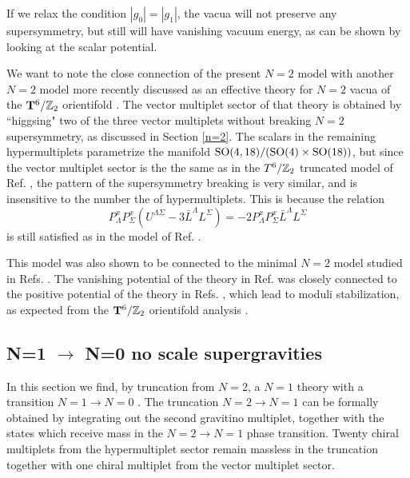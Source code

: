 \documentclass[a4paper,12pt]{article}
\begin{document}
If we relax the condition $|g_0|=|g_1|$, the vacua will not
preserve any supersymmetry, but still will have vanishing vacuum
energy, as can be shown by looking at the scalar potential.

We want to note the close connection of the present $N=2$ model
with another $N=2$ model more recently discussed as an effective
theory for $N=2$ vacua of the $\mathbf{T}^6/\mathbb{Z}_2$ orientifold
\cite{adflq}. The vector multiplet sector of that theory is
obtained by ``higgsing" two of the three vector multiplets without
breaking $N=2$ supersymmetry, as discussed in Section \ref{n=2}.
The scalars in the remaining hypermultiplets parametrize the
manifold $\mathrm{SO}(4,18)/(\mathrm{SO}(4)\times \mathrm{SO}(18))$, but since the
vector multiplet sector is the the same as in the $T^6/\mathbb{Z}_2$
truncated model of Ref. \cite{adflq}, the pattern of the
supersymmetry breaking is very similar, and is insensitive to the
number the of hypermultiplets. This is because the relation
$$P_\Lambda^xP_\Sigma^x(U^{\Lambda\Sigma}-3\bar{L}^\Lambda
L^\Sigma)=-2P_\Lambda^xP_\Sigma^x\bar{L}^\Lambda L^\Sigma$$ is
still satisfied as in the model of Ref. \cite{adflq}.





 This model
was also shown to be connected to the minimal $N=2$ model studied
in Refs. \cite{cgp,fgp}. The vanishing potential of the theory in
Ref. \cite{adflq} was closely connected to the positive potential
of the theory in Refs. \cite{cgp,fgp}, which lead to moduli
stabilization, as expected from the $\mathbf{T}^6/\mathbb{Z}_2$ orientifold
analysis \cite{gkp,fp,kst,lo,fm,kstt}.




\subsection{ N=1 $\to$ N=0 no scale supergravities}
In this section we find, by truncation from $N=2$, a $N=1$ theory
with a transition $N=1\to N=0$ \cite{fpo}. The truncation $N=2\to
N=1$ can be formally obtained by integrating out the second
gravitino multiplet, together with the states which receive mass
in the $N=2 \to N=1$ phase transition. Twenty chiral multiplets
from the hypermultiplet sector remain massless in the truncation
together with one chiral multiplet from the vector multiplet
sector.
\end{document}
